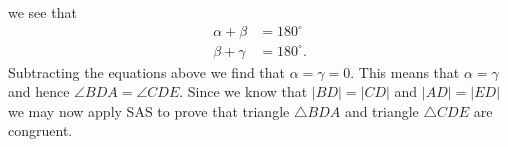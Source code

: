 \documentclass[nooutcomes,noauthor,hints]{ximera}
\begin{document}
\begin{question}
\begin{freeResponse}
\begin{center}
    \end{center}
    we see that 
    \begin{align*}
      \alpha+\beta &= 180^\circ\\
      \beta + \gamma &= 180^\circ.
\end{align*}
Subtracting the equations above we find that $\alpha=\gamma = 0$.
This means that $\alpha = \gamma$ and hence $\angle BDA = \angle
CDE$. Since we know that $\left\vert BD\right\vert =\left\vert
CD\right\vert $ and $\left\vert AD\right\vert =\left\vert
ED\right\vert $ we may now apply SAS to prove that triangle $\triangle
BDA$ and triangle $\triangle CDE$ are congruent.
\end{freeResponse}
\end{question}

\mynewpage
\end{document}

